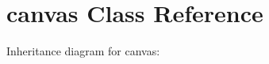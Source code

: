 \hypertarget{classcanvas}{}\section{canvas Class Reference}
\label{classcanvas}


Inheritance diagram for canvas\+:
